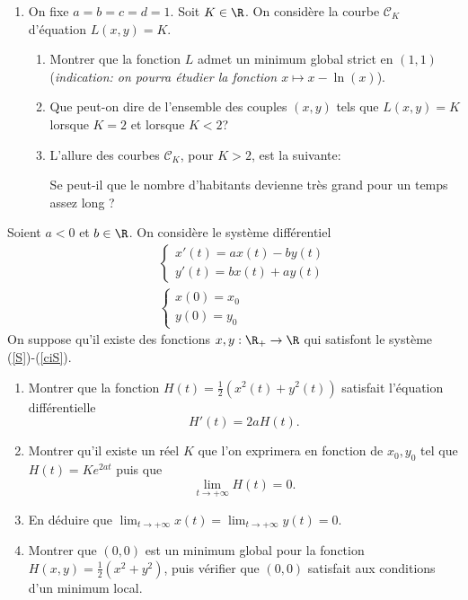 \begin{exo}
\begin{enumerate}
    \item On fixe $a=b=c=d=1$. Soit $K \in \R $. On considère la courbe $\mathcal{C}_K$ d'équation $L(x,y)=K$.
        \begin{enumerate}
            \item Montrer que la fonction $L$ admet un minimum global strict en $(1,1)$ ({\it indication: on pourra étudier la fonction $x\mapsto x-\ln(x)$}).
            \item Que peut-on dire de l'ensemble des couples $(x,y)$ tels que $L(x,y)=K$ lorsque $K=2$ et lorsque $K < 2$?
            \item L'allure des courbes $\mathcal{C}_K$, pour $K>2$, est la suivante:
                \begin{center}
                    
                \end{center}
            Se peut-il que le nombre d'habitants devienne très grand pour un temps assez long ?
        \end{enumerate}
    \end{enumerate}
\end{exo}

\begin{exo}
    Soient $a<0$ et $b \in \R $. On considère le système différentiel
    \begin{eqnarray}
        & & \left\{ \begin{array}{ll} x'(t) = ax(t) - by(t) \\
        y'(t) = bx(t) + ay(t)
    \end{array} \right.  \label{S}\\
    & & \left\{ \begin{array}{ll} x(0) = x_0 \\
    y(0)=y_0
\end{array} \right.  \label{ciS}
\end{eqnarray}
On suppose qu'il existe des fonctions $x,y:\R _{+} \rightarrow \R $ qui satisfont le système (\ref{S})-(\ref{ciS}).
\begin{enumerate}
    \item Montrer que la fonction $H(t) = \frac{1}{2}(x^{2}(t)+y^{2}(t))$ satisfait l'équation différentielle
    $$
        H'(t)=2aH(t).
    $$
    \item Montrer qu'il existe un réel $K$ que l'on exprimera en fonction de $x_{0},y_{0}$ tel que $H(t)=Ke^{2at}$ puis que
    $$
        \lim_{t \rightarrow +\infty}H(t) = 0.
    $$
    \item En déduire que  $\lim_{t \rightarrow +\infty} x(t) = \lim_{t \rightarrow +\infty} y(t) = 0$.
    \item Montrer que $(0,0)$ est un minimum global pour la fonction $H(x,y) = \frac{1}{2}(x^2+y^2)$, puis vérifier que $(0,0)$ satisfait aux conditions d'un minimum local.
\end{enumerate}
\end{exo}



